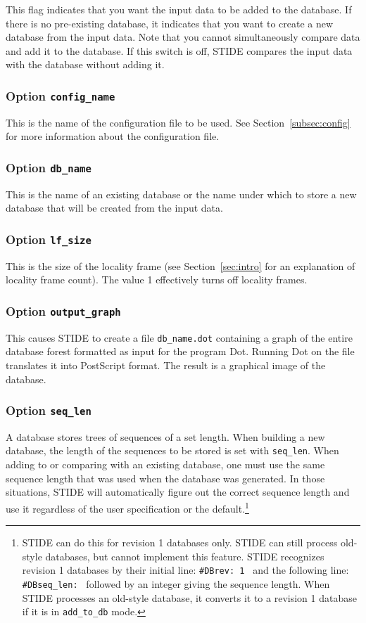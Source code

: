 \documentclass{amsart}
\begin{document}
This flag indicates that you want the input data to be added to the
database.  If there is no pre-existing database, it indicates that you
want to create a new database from the input data.  Note that you
cannot simultaneously compare data and add it to the database.  If
this switch is off, STIDE compares the input data with the database
without adding it.

\subsubsection{Option {\tt{config\_name}}}
This is the name of the configuration file to be used.  See
Section~\ref{subsec:config} for more information about the
configuration file.

\subsubsection{Option {\tt db\_name}}
This is the name of an existing database or the name under which to
store a new database that will be created from the input data.

\subsubsection{Option {\tt lf\_size}}
This is the size of the locality frame (see Section~\ref{sec:intro}
for an explanation of locality frame count).  The value 1 effectively
turns off locality frames.

\subsubsection{Option {\tt output\_graph}}
This causes STIDE to create a file {\tt db\_name.dot} containing a
graph of the entire database forest formatted as input for the program
Dot.  Running Dot on the file translates it into PostScript format.
The result is a graphical image of the database.

\subsubsection{Option {\tt seq\_len}}
A database stores trees of sequences of a set length.  When building a
new database, the length of the sequences to be stored is set with
{\tt seq\_len}.  When adding to or comparing with an existing
database, one must use the same sequence length that was used when the
database was generated.  In those situations, STIDE will automatically
figure out the correct sequence length and use it regardless of the
user specification or the default.\footnote{STIDE can do this for
  revision 1 databases only.  STIDE can still process old-style
  databases, but cannot implement this feature.  STIDE recognizes
  revision 1 databases by their initial line: {\tt \#DBrev: 1 } and the
  following line: {\tt \#DBseq\_len: }  followed by an integer giving
  the sequence length.  When STIDE processes an old-style database, it
  converts it to a revision 1 database if it is in {\tt add\_to\_db}
  mode.} 
\end{document}
